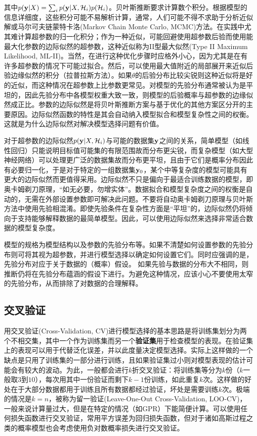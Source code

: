 \documentclass[12pt,UTF8]{article}
\begin{document}
            其中$p(\vb{y}|X)=\sum_i{p(\vb{y}|X,\mathcal{H}_i)p(\mathcal{H}_i)}$。贝叶斯推断要求计算数个积分。根据模型的信息详细度，这些积分可能不易解析计算，通常，人们可能不得不求助于分析近似解或马尔可夫链蒙特卡洛(Markov Chain Monte Carlo, MCMC)方法。在实践中尤其难计算超参数的归一化积分；作为一种近似，可能回避使用超参数后验而使用能最大化参数的边际似然的超参数，这种近似称为II型最大似然(Type II Maximum Likelihood, ML-II)。当然，在进行这种优化步骤​​时应格外小心，因为尤其是在有许多超参数的情况下可能过拟合。然后，可以使用最大值附近的局部展开来近似后验边缘似然的积分（拉普拉斯方法）。如果$\theta$的后验分布比较尖锐则这种近似将是好的近似，而这种情况在超参数上比参数更常见。对模型的先验分布通常被认为是平坦的，因此先验分布中各模型权重大致一致，则模型的后验概率与超参数的边缘似然成正比。参数的边际似然是将贝叶斯推断方案与基于优化的其他方案区分开的主要原因。边际似然函数的特性是其会自动纳入模型拟合和模型复杂性之间的权衡。这就是为什么边际似然对解决模型选择问题有价值。\par
            对于超参数的边际似然$p(\vb{y}|X,\mathcal{H}_i)$与可能的数据集$\vb{y}$之间的关系，简单模型（如线性回归）只能说明目标值可能集的有限范围故而分布更尖锐，而复杂模型（如大型神经网络）可以处理更广泛的数据集故而分布更平坦，且由于它们是概率分布因此有必要归一化，于是对于特定的一组数据集$\vb{y}_0$，某个中等复杂度的模型可能具有更大的边际似然而更值得采用。边际似然不只是偏向于最适合训练数据的模型，即奥卡姆剃刀原理，“如无必要，勿增实体”。数据拟合和模型复杂度之间的权衡是自动的，无需在外部设置参数即可解决此问题。不要将自动奥卡姆剃刀原理与贝叶斯方法中使用先验相混淆。即使先验条件在复杂性方面是“平坦”的，边际似然仍将倾向于支持能够解释数据的最简单模型。因此，可以使用边际似然来选择非常适合数据的模型复杂度。\par
            模型的规格为模型结构以及参数的先验分布等。如果不清楚如何设置参数的先验分布则可将其视为超参数，并进行模型选择以确定如何设置它们。同时应强调的是，先验分布对应于关于数据的（概率）假设。 如果先验与数据的分布大不相同，则推断仍将在先验分布蕴涵的假设下进行。为避免这种情况，应该小心不要使用太窄的先验分布，从而排除了对数据的合理解释。
        \subsection{交叉验证}
            用交叉验证(Cross-Validation, CV)进行模型选择的基本思路是将训练集划分为两个不相交集，其中一个作为训练集而另一个\textbf{验证集}用于检查模型的表现。在验证集上的表现可以用于代替泛化误差，并以此度量决定模型选择。实际上这样做的一个缺点是只用了训练集的一部分进行训练，且如果验证集过小则对模型表现的估计可能会有较大的波动。为此，一般都会进行$k$折交叉验证：将训练集等分为$k$份（$k$一般取$3$到$10$），每次用其中一份验证而剩下$k-1$份训练，如此重复$k$次。这样做的好处在于大部分数据都用于训练且所有数据都经过验证，坏处是需要训练$k$次。极端的情况是$k=n$，被称为留一验证(Leave-One-Out Cross-Validation, LOO-CV)，一般来说计算量过大，但是在特定的情况（如GPR）下能简便计算。可以使用任何损失函数进行交叉验证，常用平方误差为回归损失函数，但对于诸如高斯过程之类的概率模型也会考虑使用负对数概率损失进行交叉验证。
\end{document}
